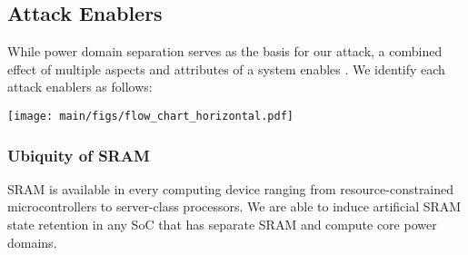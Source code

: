 
\subsection{Attack Enablers}
\label{sub_sec_attack_enablers}

While power domain separation serves as the basis for our attack, a combined effect of multiple aspects and attributes of a system enables \sys{}.
We identify each attack enablers as follows:
   
   
    \begin{figure*}
    \centering
    \texttt{[image: main/figs/flow\_chart\_horizontal.pdf]}
    \caption{Attack flow.}
    \label{fig:attack_execution}
\end{figure*}

\subsubsection{Ubiquity of SRAM}

SRAM is available in every computing device ranging from resource-constrained microcontrollers to server-class processors. 
We are able to induce artificial SRAM state retention in any SoC that has separate SRAM and compute core power domains.

